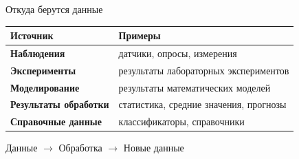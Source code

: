\documentclass[aspectratio=169]{beamer}
\begin{document}
\begin{frame}{Откуда берутся данные}

\small

\begin{table}

\centering

\begin{tabular}{>{\bfseries}p{}|p{}}

\toprule

Источник & Примеры \\

\midrule

Наблюдения & датчики, опросы, измерения \\

Эксперименты & результаты лабораторных экспериментов \\

Моделирование & результаты математических моделей \\

Результаты обработки & статистика, средние значения, прогнозы \\

Справочные данные & классификаторы, справочники \\

\bottomrule

\end{tabular}

\end{table}

\vspace{0.4cm}

\begin{center}

\large

Данные $\rightarrow$ Обработка $\rightarrow$ Новые данные

\end{center}

\end{frame}


\end{document}
